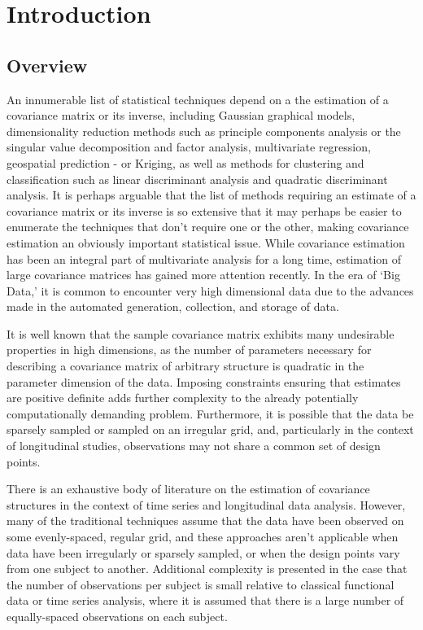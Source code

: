 \chapter{Introduction}
\label{intro.ch}

\section{Overview}

An innumerable list of statistical techniques depend on a the estimation of a covariance matrix or its inverse, including Gaussian graphical models, dimensionality reduction methods such as principle components analysis or the singular value decomposition and factor analysis, multivariate regression, geospatial prediction - or Kriging, as well as methods for clustering and classification such as linear discriminant analysis and quadratic discriminant analysis. It is perhaps arguable that the list of methods requiring an estimate of a covariance matrix or its inverse is so extensive that it may perhaps be easier to enumerate the techniques that don't require one or the other, making covariance estimation an obviously important statistical issue. While covariance estimation has been an integral part of multivariate analysis for a long time, estimation of large covariance matrices has gained more attention recently. In the era of `Big Data,' it is common to encounter very high dimensional data due to the advances made in the automated generation, collection, and storage of data. 

It is well known that the sample covariance matrix exhibits many undesirable properties in high dimensions, as the number of parameters necessary for describing a covariance matrix of arbitrary structure is quadratic in the parameter dimension of the data. Imposing constraints ensuring that estimates are positive definite adds further complexity to the already potentially computationally demanding problem. Furthermore, it is possible that the data be sparsely sampled or sampled on an irregular grid, and, particularly in the context of longitudinal studies, observations may not share a common set of design points.  



There is an exhaustive body of literature on the estimation of covariance structures in the context of time series and longitudinal data analysis. However, many of the traditional techniques assume that the data have been observed on some evenly-spaced, regular grid, and these approaches aren't applicable when data have been irregularly or sparsely sampled, or when the design points vary from one subject to another. Additional complexity is presented in the case that the number of observations per subject is small relative to classical functional data or time series analysis, where it is assumed that there is a large number of equally-spaced observations on each subject. 

